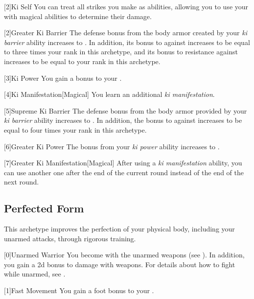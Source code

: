        [2]{Ki Self} You can treat all strikes you make as  abilities, allowing you to use your  with magical abilities to determine their damage.

        [2]{Greater Ki Barrier} 
        The defense bonus from the body armor created by your \textit{ki barrier} ability increases to .
        In addition, its bonus to  against  increases to be equal to three times your rank in this archetype, and its bonus to resistance against  increases to be equal to your rank in this archetype.

        [3]{Ki Power}
        You gain a  bonus to your  .

        [4]{Ki Manifestation}[Magical]
        You learn an additional \textit{ki manifestation}.

        [5]{Supreme Ki Barrier} The defense bonus from the body armor provided by your \textit{ki barrier} ability increases to .
        In addition, the bonus to  against  increases to be equal to four times your rank in this archetype.

        [6]{Greater Ki Power} The bonus from your \textit{ki power} ability increases to .

        [7]{Greater Ki Manifestation}[Magical] After using a \textit{ki manifestation} ability, you can use another one after the end of the current round instead of the end of the next round.

    \newpage
    \subsection{Perfected Form}
        This archetype improves the perfection of your physical body, including your unarmed attacks, through rigorous training.

        [0]{Unarmed Warrior} You become  with the unarmed weapons  (see ).
        In addition, you gain a \plus2d bonus to damage with  weapons.
        For details about how to fight while unarmed, see .

        [1]{Fast Movement} You gain a  foot bonus to your .

